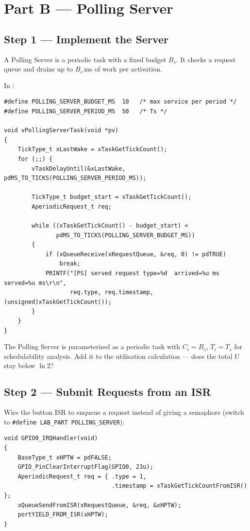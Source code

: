 \documentclass[11pt, a4paper]{article}
\begin{document}
\section{Part B --- Polling Server}

\subsection{Step 1 --- Implement the Server}

A Polling Server is a periodic task with a fixed budget $B_s$. It checks a request queue
and drains up to $B_s$\,ms of work per activation.

In :

\begin{lstlisting}[style=cstyle]
#define POLLING_SERVER_BUDGET_MS  10   /* max service per period */
#define POLLING_SERVER_PERIOD_MS  50   /* Ts */

void vPollingServerTask(void *pv)
{
    TickType_t xLastWake = xTaskGetTickCount();
    for (;;) {
        vTaskDelayUntil(&xLastWake, pdMS_TO_TICKS(POLLING_SERVER_PERIOD_MS));

        TickType_t budget_start = xTaskGetTickCount();
        AperiodicRequest_t req;

        while ((xTaskGetTickCount() - budget_start) <
               pdMS_TO_TICKS(POLLING_SERVER_BUDGET_MS))
        {
            if (xQueueReceive(xRequestQueue, &req, 0) != pdTRUE)
                break;
            PRINTF("[PS] served request type=%d  arrived=%u ms  served=%u ms\r\n",
                   req.type, req.timestamp, (unsigned)xTaskGetTickCount());
        }
    }
}
\end{lstlisting}

\begin{warnbox}
  The Polling Server is parameterised as a periodic task with $C_i = B_s$,
  $T_i = T_s$ for schedulability analysis. Add it to the utilisation calculation ---
  does the total $U$ stay below $\ln 2$?
\end{warnbox}

\subsection{Step 2 --- Submit Requests from an ISR}

Wire the button ISR to enqueue a request instead of giving a semaphore
(switch  to \texttt{\#define LAB\_PART POLLING\_SERVER}):

\begin{lstlisting}[style=cstyle]
void GPIO0_IRQHandler(void)
{
    BaseType_t xHPTW = pdFALSE;
    GPIO_PinClearInterruptFlag(GPIO0, 23u);
    AperiodicRequest_t req = { .type = 1,
                               .timestamp = xTaskGetTickCountFromISR() };
    xQueueSendFromISR(xRequestQueue, &req, &xHPTW);
    portYIELD_FROM_ISR(xHPTW);
}
\end{lstlisting}
\end{document}
